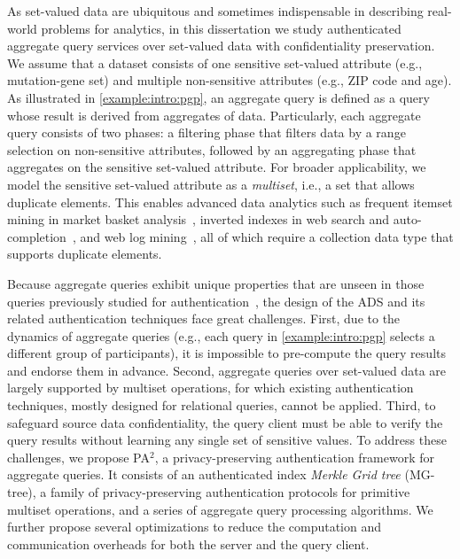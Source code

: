 As set-valued data are ubiquitous and sometimes indispensable in describing real-world problems for analytics, in this dissertation we study authenticated aggregate query services over set-valued data with confidentiality preservation. We assume that a dataset consists of one sensitive set-valued attribute (e.g., mutation-gene set) and multiple non-sensitive attributes (e.g., ZIP code and age). As illustrated in \cref{example:intro:pgp}, an aggregate query is defined as a query whose result is derived from aggregates of data. Particularly, each aggregate query consists of two phases: a filtering phase that filters data by a range selection on non-sensitive attributes, followed by an aggregating phase that aggregates on the sensitive set-valued attribute. For broader applicability, we model the sensitive set-valued attribute as a \emph{multiset}, i.e., a set that allows duplicate elements. This enables advanced data analytics such as frequent itemset mining in market basket analysis~\cite{Agrawal:1994:FAM:645920.672836}, inverted indexes in web search and auto-completion~\cite{10.1145/1148170.1148234}, and web log mining~\cite{10.14778/2212351.2212353}, all of which require a collection data type that supports duplicate elements.

Because aggregate queries exhibit unique properties that are unseen in those queries previously studied for authentication~\cite{10.1109/ICDE.2004.1320027,10.1145/1142473.1142488,10.1007/s00778-008-0113-2}, the design of the ADS and its related authentication techniques face great challenges. First, due to the dynamics of aggregate queries (e.g., each query in \cref{example:intro:pgp} selects a different group of participants), it is impossible to pre-compute the query results and endorse them in advance. Second, aggregate queries over set-valued data are largely supported by multiset operations, for which existing authentication techniques, mostly designed for relational queries, cannot be applied. Third, to safeguard source data confidentiality, the query client must be able to verify the query results without learning any single set of sensitive values. To address these challenges, we propose PA$^2$, a privacy-preserving authentication framework for aggregate queries. It consists of an authenticated index \emph{Merkle Grid tree} (MG-tree), a family of privacy-preserving authentication protocols for primitive multiset operations, and a series of aggregate query processing algorithms. We further propose several optimizations to reduce the computation and communication overheads for both the server and the query client.

